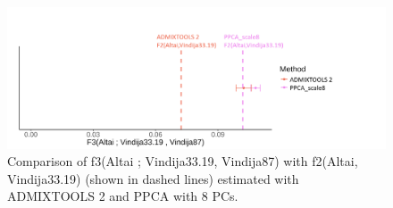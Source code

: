 \documentclass[12pt, letterpaper]{article}
\begin{document}
\begin{figure}[ht!]
    \includegraphics[width=16.5cm]{Images/Supplement/f2_f3_corr_x1.png}
    \centering
    \caption{Comparison of f3(Altai ; Vindija33.19, Vindija87) with f2(Altai, Vindija33.19) (shown in dashed lines) estimated with ADMIXTOOLS 2 and PPCA with 8 PCs.} 
    \label{figS2:pc_scale}
\end{figure}
\end{document}
